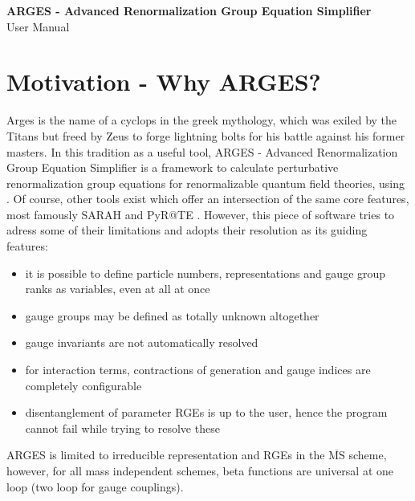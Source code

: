 \documentclass{scrartcl}
\begin{document}
\begin{titlepage}
\centering
{\LARGE \bfseries ARGES - Advanced Renormalization Group Equation Simplifier}\\
\vspace{20em}
\LARGE User Manual
\end{titlepage}
\newpage
\tableofcontents
\thispagestyle{empty}
\newpage
\section{Motivation - Why ARGES?}
Arges is the name of a cyclops in the greek mythology, which was exiled by the Titans but freed by Zeus to forge lightning bolts for his battle against his former masters. \newline
In this tradition as a useful tool, ARGES - Advanced Renormalization Group Equation Simplifier is a framework to calculate perturbative renormalization group equations for renormalizable quantum field theories, using \cite{LuoWangXiao,MV1,MV2,MV3,vev1,vev2,gauge3L,gauge3L2,OsbornJack,OsbornJack2,OsbornJack3,Decoding}. Of course, other tools exist which offer an intersection of the same core features, most famously SARAH \cite{SARAH,SARAH4} and PyR@TE \cite{pyrate,pyrate2}. However, this piece of software tries to adress some of their limitations and adopts their resolution as its guiding features:
\begin{itemize}
\item it is possible to define particle numbers, representations and gauge group ranks as variables, even at all at once
\item gauge groups may be defined as totally unknown altogether
\item gauge invariants are not automatically resolved
\item for interaction terms, contractions of generation and gauge indices are completely configurable
\item disentanglement of parameter RGEs is up to the user, hence the program cannot fail while trying to resolve these
\end{itemize}
ARGES is limited to irreducible representation and RGEs in the $\overline{\mathrm{MS}}$ scheme, however, for all mass independent schemes, beta functions are universal at one loop (two loop for gauge couplings).
\newpage
\end{document}
